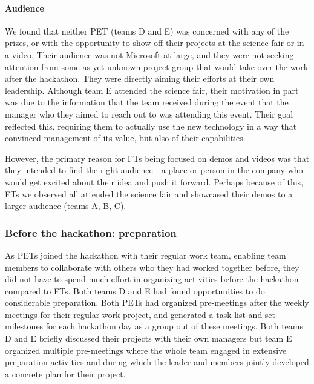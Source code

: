 \documentclass{hcij}
\begin{document}
\paragraph{Audience}
We found that neither PET (teams D and E) was concerned with any of the prizes, or with the opportunity to show off their projects at the science fair or in a video. Their audience was not Microsoft at large, and they were not seeking attention from some as-yet unknown project group that would take over the work after the hackathon. They were directly aiming their efforts at their own leadership. Although team E attended the science fair, their motivation in part was due to the information that the team received during the event that the manager who they aimed to reach out to was attending this event. Their goal reflected this, requiring them to actually use the new technology in a way that convinced management of its value, but also of their capabilities.

However, the primary reason for FTs being focused on demos and videos was that they intended to find the right audience—a place or person in the company who would get excited about their idea and push it forward. Perhaps because of this, FTs we observed all attended the science fair and showcased their demos to a larger audience (teams A, B, C).

\subsubsection{Before the hackathon: preparation}
As PETs joined the hackathon with their regular work team, enabling team members to collaborate with others who they had worked together before, they did not have to spend much effort in organizing activities before the hackathon compared to FTs. Both teams D and E had found opportunities to do considerable preparation. Both PETs had organized pre-meetings after the weekly meetings for their regular work project, and generated a task list and set milestones for each hackathon day as a group out of these meetings. Both teams D and E briefly discussed their projects with their own managers but team E organized multiple pre-meetings where the whole team engaged in extensive preparation activities and during which the leader and members jointly developed a concrete plan for their project.
\end{document}
